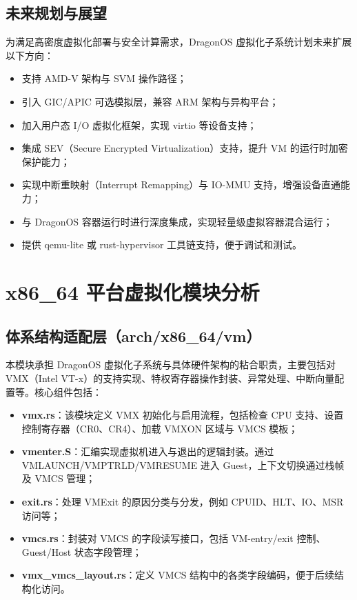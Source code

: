 \documentclass[analyze]{mancls}
\begin{document}
\subsection{未来规划与展望}
为满足高密度虚拟化部署与安全计算需求，DragonOS 虚拟化子系统计划未来扩展以下方向：

\begin{itemize}
    \item 支持 AMD-V 架构与 SVM 操作路径；
    \item 引入 GIC/APIC 可选模拟层，兼容 ARM 架构与异构平台；
    \item 加入用户态 I/O 虚拟化框架，实现 virtio 等设备支持；
    \item 集成 SEV（Secure Encrypted Virtualization）支持，提升 VM 的运行时加密保护能力；
    \item 实现中断重映射（Interrupt Remapping）与 IO-MMU 支持，增强设备直通能力；
    \item 与 DragonOS 容器运行时进行深度集成，实现轻量级虚拟容器混合运行；
    \item 提供 qemu-lite 或 rust-hypervisor 工具链支持，便于调试和测试。
\end{itemize}

\section{x86\_64 平台虚拟化模块分析}

\subsection{体系结构适配层（arch/x86\_64/vm）}
本模块承担 DragonOS 虚拟化子系统与具体硬件架构的粘合职责，主要包括对 VMX（Intel VT-x）的支持实现、特权寄存器操作封装、异常处理、中断向量配置等。核心组件包括：

\begin{itemize}
    \item \textbf{vmx.rs}：该模块定义 VMX 初始化与启用流程，包括检查 CPU 支持、设置控制寄存器（CR0、CR4）、加载 VMXON 区域与 VMCS 模板；
    \item \textbf{vmenter.S}：汇编实现虚拟机进入与退出的逻辑封装。通过 VMLAUNCH/VMPTRLD/VMRESUME 进入 Guest，上下文切换通过栈帧及 VMCS 管理；
    \item \textbf{exit.rs}：处理 VMExit 的原因分类与分发，例如 CPUID、HLT、IO、MSR 访问等；
    \item \textbf{vmcs.rs}：封装对 VMCS 的字段读写接口，包括 VM-entry/exit 控制、Guest/Host 状态字段管理；
    \item \textbf{vmx\_vmcs\_layout.rs}：定义 VMCS 结构中的各类字段编码，便于后续结构化访问。
\end{itemize}
\end{document}
